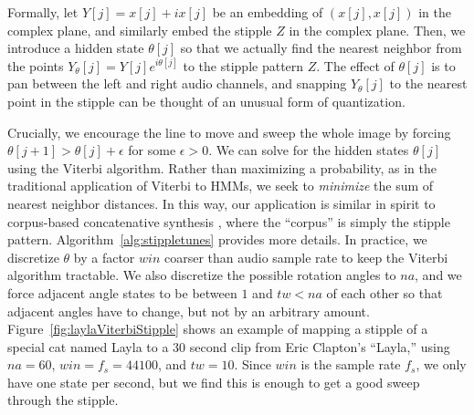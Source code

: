 \documentclass{article}
\begin{document}
Formally, let $Y[j] = x[j] + i x[j]$ be an embedding of $(x[j], x[j])$ in the complex plane, and similarly embed the stipple $Z$ in the complex plane.  Then, we introduce a hidden state $\theta[j]$ so that we actually find the nearest neighbor from the points $Y_{\theta}[j] = Y[j] e^{i \theta[j]}$ to the stipple pattern $Z$.  The effect of $\theta[j]$ is to pan between the left and right audio channels, and snapping $Y_{\theta}[j]$ to the nearest point in the stipple can be thought of an unusual form of quantization.  




Crucially, we encourage the line to move and sweep the whole image by forcing $\theta[j+1] > \theta[j] + \epsilon$ for some $\epsilon > 0$.  We can solve for the hidden states $\theta[j]$ using the Viterbi algorithm.  Rather than maximizing a probability, as in the traditional application of Viterbi to HMMs, we seek to {\em minimize} the sum of nearest neighbor distances.  In this way, our application is similar in spirit to corpus-based concatenative synthesis \cite{schwarz2007corpus}, where the ``corpus'' is simply the stipple pattern.  Algorithm~\ref{alg:stippletunes} provides more details. In practice, we discretize $\theta$ by a factor $win$ coarser than audio sample rate to keep the Viterbi algorithm tractable.  We also discretize the possible rotation angles to $na$, and we force adjacent angle states to be between $1$ and $tw < na$ of each other so that adjacent angles have to change, but not by an arbitrary amount.  Figure~\ref{fig:laylaViterbiStipple} shows an example of mapping a stipple of a special cat named Layla to a 30 second clip from Eric Clapton's ``Layla,'' using $na=60$, $win=f_s=44100$, and $tw=10$.  Since $win$ is the sample rate $f_s$, we only have one state per second, but we find this is enough to get a good sweep through the stipple.






\end{document}
